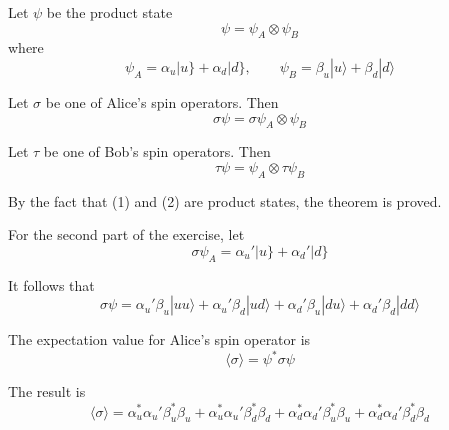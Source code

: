 


\bigskip
Let $\psi$ be the product state
\begin{equation*}
\psi=\psi_A\otimes\psi_B
\end{equation*}
where
\begin{equation*}
\psi_A=\alpha_u|u\}+\alpha_d|d\},
\qquad
\psi_B=\beta_u|u\rangle+\beta_d|d\rangle
\end{equation*}

Let $\sigma$ be one of Alice's spin operators.
Then
\begin{equation*}
\sigma\psi=\sigma\psi_A\otimes\psi_B
\tag{1}
\end{equation*}

Let $\tau$ be one of Bob's spin operators.
Then
\begin{equation*}
\tau\psi=\psi_A\otimes\tau\psi_B
\tag{2}
\end{equation*}

By the fact that (1) and (2) are product states, the theorem is proved.

\bigskip
For the second part of the exercise, let
\begin{equation*}
\sigma\psi_A=\alpha_u'|u\}+\alpha_d'|d\}
\end{equation*}

It follows that
\begin{equation*}
\sigma\psi=\alpha_u'\beta_u|uu\rangle+\alpha_u'\beta_d|ud\rangle+\alpha_d'\beta_u|du\rangle+\alpha_d'\beta_d|dd\rangle
\end{equation*}

The expectation value for Alice's spin operator is
\begin{equation*}
\langle\sigma\rangle=\psi^*\sigma\psi
\tag{3}
\end{equation*}

The result is
\begin{equation*}
\langle\sigma\rangle
=\alpha_u^*\alpha_u'\beta_u^*\beta_u+\alpha_u^*\alpha_u'\beta_d^*\beta_d
+\alpha_d^*\alpha_d'\beta_u^*\beta_u+\alpha_d^*\alpha_d'\beta_d^*\beta_d
\end{equation*}

